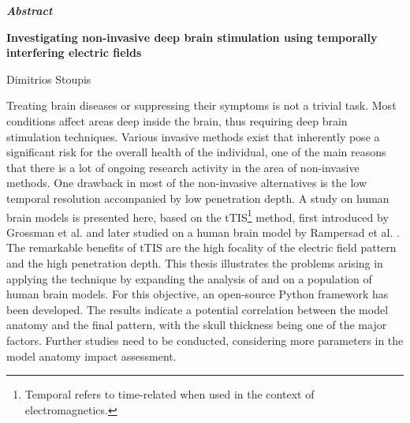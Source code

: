 \thispagestyle{plain}
\vspace*{\fill}
\begin{center}
    \LARGE
    \textit{\textbf{Abstract}}
        
    \vspace{0.4cm}
    \large
    \textbf{Investigating non-invasive deep brain stimulation using temporally interfering electric fields}
        
    \vspace{0.4cm}
    Dimitrios Stoupis
\end{center}
\normalsize

\vspace{0.9cm}
Treating brain diseases or suppressing their symptoms is not a trivial task. Most conditions affect areas deep inside the brain, thus requiring deep brain stimulation techniques. Various invasive methods exist that inherently pose a significant risk for the overall health of the individual, one of the main reasons that there is a lot of ongoing research activity in the area of non-invasive methods. One drawback in most of the non-invasive alternatives is the low temporal resolution accompanied by low penetration depth. A study on human brain models \cite{ErikG.Lee2016} is presented here, based on the \gls{tTIS}\footnote{Temporal refers to time-related when used in the context of electromagnetics.} method, first introduced by Grossman et al. \cite{Grossman2017} and later studied on a human brain model by Rampersad et al. \cite{Rampersad2019}. The remarkable benefits of \gls{tTIS} are the high focality of the electric field pattern and the high penetration depth. This thesis illustrates the problems arising in applying the technique by expanding the analysis of  and  on a population of human brain models. For this objective, an open-source Python framework \cite{thesis_repo} has been developed. The results indicate a potential correlation between the model anatomy and the final pattern, with the skull thickness being one of the major factors. Further studies need to be conducted, considering more parameters in the model anatomy impact assessment.
\vspace*{\fill}
